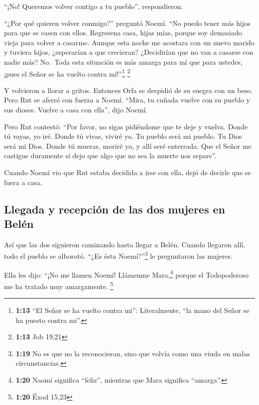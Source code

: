  ``¡No! Queremos volver contigo a tu pueblo'',
respondieron.

 ``¿Por qué quieren volver conmigo?'' preguntó Noemí.
``No puedo tener más hijos para que se casen con ellos. 
Regresena casa, hijas mías, porque soy demasiado vieja para volver a
casarme. Aunque esta noche me acostara con un nuevo marido y tuviera
hijos,  ¿esperarían a que crecieran? ¿Decidirían que no
van a casarse con nadie más? No.~Toda esta situación es más amarga para
mí que para ustedes, ¡pues el Señor se ha vuelto contra mí!''\footnote{\textbf{1:13}
  ``El Señor se ha vuelto contra mi'': Literalmente, ``la mano del Señor
  se ha puesto contra mi''.} \footnote{\textbf{1:13} Job 19,21}

 Y volvieron a llorar a gritos. Entonces Orfa se despidió
de su suegra con un beso. Pero Rut se aferró con fuerza a Noemí.
 ``Mira, tu cuñada vuelve con su pueblo y sus dioses.
Vuelve a casa con ella'', dijo Noemí.

 Pero Rut contestó: ``Por favor, no sigas pidiéndome que
te deje y vuelva. Donde tú vayas, yo iré. Donde tú vivas, viviré yo. Tu
pueblo será mi pueblo. Tu Dios será mi Dios.  Donde tú
mueras, moriré yo, y allí seré enterrada. Que el Señor me castigue
duramente si dejo que algo que no sea la muerte nos separe''.

 Cuando Noemí vio que Rut estaba decidida a irse con
ella, dejó de decirle que se fuera a casa.

\hypertarget{llegada-y-recepciuxf3n-de-las-dos-mujeres-en-beluxe9n}{%
\subsection{Llegada y recepción de las dos mujeres en
Belén}\label{llegada-y-recepciuxf3n-de-las-dos-mujeres-en-beluxe9n}}

 Así que las dos siguieron caminando hasta llegar a
Belén. Cuando llegaron allí, todo el pueblo se alborotó. ``¿Es ésta
Noemí?''\footnote{\textbf{1:19} No es que no la reconocieran, sino que
  volvía como una viuda en malas circunstancias.} le preguntaron las
mujeres.

 Ella les dijo: ``¡No me llamen Noemí! Llámenme
Mara,\footnote{\textbf{1:20} Naomi significa ``feliz'', mientras que
  Mara significa ``amarga''.} porque el Todopoderoso me ha tratado muy
amargamente. \footnote{\textbf{1:20} Éxod 15,23}

